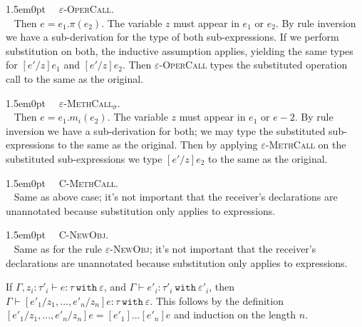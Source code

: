 \documentclass{llncs}
\newcommand{\keywadj}[1]{\mathtt{#1}}
\newcommand{\keyw}[1]{\keywadj{#1}~}
\newcommand{\proofcase}[2]{
	\begin{adjustwidth}{1.5em}{0pt}
		\fbox{Case.}~~#1. \\ ~#2
	\end{adjustwidth}
}
\begin{document}
{	\proofcase{\textsc{$\varepsilon$-OperCall}} {
		Then $e = e_1.\pi(e_2)$. The variable $z$ must appear in $e_1$ or $e_2$. By rule inversion we have a sub-derivation for the type of both sub-expressions. If we perform substitution on both, the inductive assumption applies, yielding the same types for $[e'/z]e_1$ and $[e'/z]e_2$. Then \textsc{$\varepsilon$-OperCall} types the substituted operation call to the same as the original. \\
	}

	\proofcase{\textsc{$\varepsilon$-MethCall$_\sigma$}} {
		Then $e =e _1.m_i(e_2)$. The variable $z$ must appear in $e_1$ or $e-2$. By rule inversion we have a sub-derivation for both; we may type the substituted sub-expressions to the same as the original. Then by applying \textsc{$\varepsilon$-MethCall} on the substituted sub-expressions we type $[e'/z]e_2$ to the same as the original. \\
	}
		
	\proofcase{\textsc{C-MethCall}} {
		Same as above case; it's not important that the receiver's declarations are unannotated because substitution only applies to expressions. \\
	}
	
	\proofcase{\textsc{C-NewObj}} {
		Same as for the rule \textsc{$\varepsilon$-NewObj}; it's not important that the receiver's declarations are unannotated because substitution only applies to expressions.
	}
}

\noindent
{} If $\Gamma, z_i : \tau'_i \vdash e : \tau~\keyw{with} \varepsilon$, and $\Gamma \vdash e'_i : \tau'_i~\keyw{with} \varepsilon'_i$, then $\Gamma \vdash [e'_1/z_1, ..., e'_n/z_n]e : \tau~\keyw{with} \varepsilon$. This follows by the definition $[e'_1/z_1, ..., e'_n/z_n]e = [e'_1]...[e'_n]e$ and induction on the length $n$. \\
\end{document}
